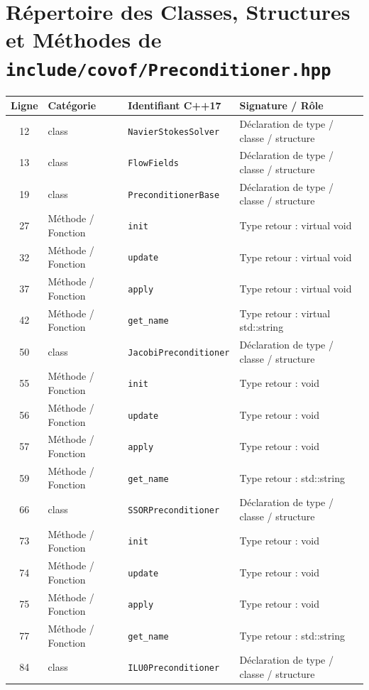 \documentclass[10pt,a4paper,oneside]{book}
\begin{document}
\section{Répertoire des Classes, Structures et Méthodes de \texttt{include/covof/Preconditioner.hpp}}
\begin{center}\small
\begin{tabular}{clll}
\toprule
\textbf{Ligne} & \textbf{Catégorie} & \textbf{Identifiant C++17} & \textbf{Signature / Rôle} \\
\midrule
12 & class & \texttt{NavierStokesSolver} & Déclaration de type / classe / structure \\
13 & class & \texttt{FlowFields} & Déclaration de type / classe / structure \\
19 & class & \texttt{PreconditionerBase} & Déclaration de type / classe / structure \\
27 & Méthode / Fonction & \texttt{init} & Type retour : virtual void \\
32 & Méthode / Fonction & \texttt{update} & Type retour : virtual void \\
37 & Méthode / Fonction & \texttt{apply} & Type retour : virtual void \\
42 & Méthode / Fonction & \texttt{get\_name} & Type retour : virtual std::string \\
50 & class & \texttt{JacobiPreconditioner} & Déclaration de type / classe / structure \\
55 & Méthode / Fonction & \texttt{init} & Type retour : void \\
56 & Méthode / Fonction & \texttt{update} & Type retour : void \\
57 & Méthode / Fonction & \texttt{apply} & Type retour : void \\
59 & Méthode / Fonction & \texttt{get\_name} & Type retour : std::string \\
66 & class & \texttt{SSORPreconditioner} & Déclaration de type / classe / structure \\
73 & Méthode / Fonction & \texttt{init} & Type retour : void \\
74 & Méthode / Fonction & \texttt{update} & Type retour : void \\
75 & Méthode / Fonction & \texttt{apply} & Type retour : void \\
77 & Méthode / Fonction & \texttt{get\_name} & Type retour : std::string \\
84 & class & \texttt{ILU0Preconditioner} & Déclaration de type / classe / structure \\

\end{tabular}
\end{center}
\end{document}
